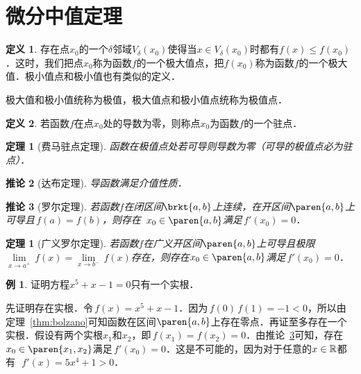 \documentclass[a4paper,punct=CCT]{ctexbook}
\makeatletter
\newtheorem{theorem}{定理}
\newtheorem*{theorem*}{定理}
\newtheorem{corollary}[theorem]{推论}
\theoremstyle{definition}
\newtheorem*{definition*}{定义}
\newtheorem*{example*}{例}
\theoremstyle{remark}
\renewcommand*{\proofname}{证}
\renewenvironment{proof}[1][\proofname]{\par
  \pushQED{\qed}%
  \normalfont \topsep6\p@\@plus6\p@\relax
  \trivlist
  \item[\hskip\labelsep
    \bfseries
    #1%
    ]\ignorespaces
}{%
  \popQED\endtrivlist\@endpefalse
}
\let\leq\leqslant
\let\le\leq
\makeatother
\begin{document}
\section{微分中值定理}

\begin{definition*}
  \label{defn:extrema}
  存在点\(x_0\)的一个\(\delta\)邻域\(V_\delta(x_0)\)使得当\(x \in V_\delta(x_0)\)时都有\(f(x) \le f(x_0)\)．这时，我们把点\(x_0\)称为函数\(f\)的一个极大值点，把\(f(x_0)\)称为函数\(f\)的一个极大值．极小值点和极小值也有类似的定义．

  极大值和极小值统称为极值，极大值点和极小值点统称为极值点．
\end{definition*}


\begin{definition*}
  \label{defn:stationary}
  若函数\(f\)在点\(x_0\)处的导数为零，则称点\(x_0\)为函数\(f\)的一个驻点．
\end{definition*}

\begin{theorem}[费马驻点定理]
  \label{thm:fermat}
  函数在极值点处若可导则导数为零（可导的极值点必为驻点）．
\end{theorem}

\begin{corollary}[达布定理]
  \label{cor:darboux}
  导函数满足介值性质．
\end{corollary}

\begin{corollary}[罗尔定理]
  \label{cor:rolle}
  若函数\(f\)在闭区间\(\brkt{a,b}\)上连续，在开区间\(\paren{a,b}\)上可导且\(\,f(a) = f(b)\)，则存在~\(x_0 \in \paren{a,b}\)满足\(\,f'(x_0) = 0\)．
\end{corollary}

\begin{theorem*}[广义罗尔定理]
  \label{thm:genrolle}
  若函数\(f\)在广义开区间\(\paren{a,b}\)上可导且极限\(\!\lim\limits_{x\to a^+\!} \,f(x) = \lim\limits_{x\to b^-\!} \,f(x)\)存在，则存在\(x_0 \in \paren{a,b}\)满足\(\,f'(x_0) = 0\)．
\end{theorem*}

\begin{example*}
  证明方程\(x^5+x-1 = 0\)只有一个实根．

  \begin{proof}
    先证明存在实根．令\(\,f(x) = x^5+x-1\)．因为\(\,f(0)\,f(1) = -1 < 0\)，所以由定理~\ref{thm:bolzano}可知函数在区间\(\paren{a,b}\)上存在零点．再证至多存在一个实根．假设有两个实根\(x_1\)和\(x_2\)，即\(\,f(x_1) = f(x_2) = 0\)．由推论~\ref{cor:rolle}可知，存在\(x_0 \in \paren{x_1, x_2}\)满足\(\,f'(x_0) = 0\)．这是不可能的，因为对于任意的\(x \in \mathbb{R}\)都有~\(\,f'(x) = 5x^4 + 1 > 0\)．
  \end{proof}
\end{example*}
\end{document}
